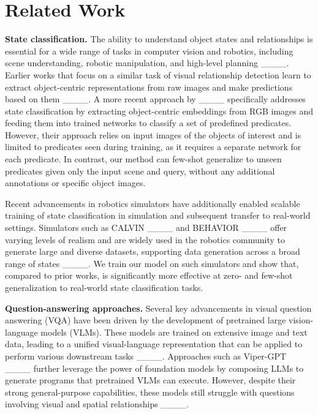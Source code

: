 \section{Related Work}
\vspace{-0.5cm}
\textbf{State classification.}
The ability to understand object states and relationships is essential for a wide range of tasks in computer vision and robotics, including scene understanding, robotic manipulation, and high-level planning ____. Earlier works that focus on a similar task of visual relationship detection learn to extract object-centric representations from raw images and make predictions based on them ____. A more recent approach by ____ specifically addresses state classification by extracting object-centric embeddings from RGB images and feeding them into trained networks to classify a set of predefined predicates. However, their approach relies on input images of the objects of interest and is limited to predicates seen during training, as it requires a separate network for each predicate. In contrast, our method can few-shot generalize to unseen predicates given only the input scene and query, without any additional annotations or specific object images.

Recent advancements in robotics simulators have additionally enabled scalable training of state classification in simulation and subsequent transfer to real-world settings. Simulators such as CALVIN ____ and BEHAVIOR ____ offer varying levels of realism and are widely used in the robotics community to generate large and diverse datasets, supporting data generation across a broad range of states ____. We train our model on such simulators and show that, compared to prior works, \model is significantly more effective at zero- and few-shot generalization to real-world state classification tasks.

\vspace{-0.1cm}
\textbf{Question-answering approaches.}
Several key advancements in visual question answering (VQA) have been driven by the development of pretrained large vision-language models (VLMs). These models are trained on extensive image and text data, leading to a unified visual-language representation that can be applied to perform various downstream tasks ____. Approaches such as Viper-GPT ____ further leverage the power of foundation models by composing LLMs to generate programs that pretrained VLMs can execute. However, despite their strong general-purpose capabilities, these models still struggle with questions involving visual and spatial relationships ____.

